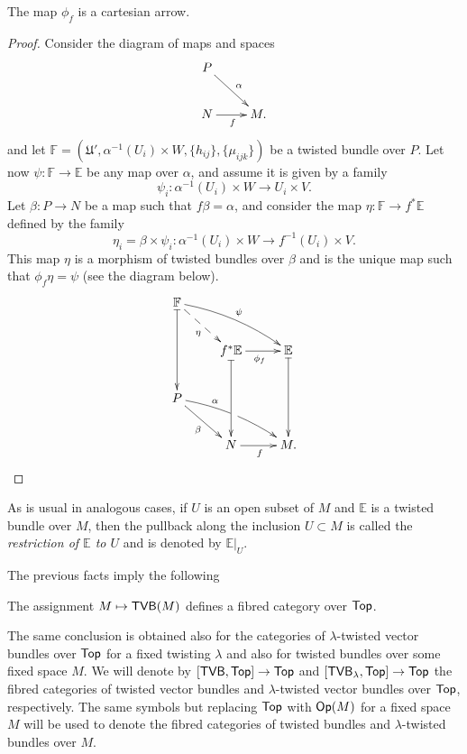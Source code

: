 \begin{proposition}\label{tvb_cartesian}
The map $\phi_f$ is a cartesian arrow.
\end{proposition}
\begin{proof}
Consider the diagram of maps and spaces
$$
\xymatrix{
P \ar[dr]^{\alpha} & \\
N\ar[r]_f & M.}
$$
and let $\mathbb{F} =(\mathfrak{U}',\alpha^{-1}(U_i)\times W,\{h_{ij}\},\{\mu_{ijk}\})$ be a twisted bundle over $P$. Let now $\psi :\mathbb{F}\to \mathbb{E}$ be any map over $\alpha$, and assume it is given by a family
$$\psi_i:\alpha^{-1}(U_i)\times W\longrightarrow U_i\times V.$$
Let $\beta :P\to N$ be a map such that $f\beta =\alpha$, and consider the map $\eta :\mathbb{F}\to f^*\mathbb{E}$ defined by the family
$$\eta_i=\beta \times \psi_i:\alpha^{-1}(U_i)\times W\longrightarrow f^{-1}(U_i)\times V.$$
This map $\eta$ is a morphism of twisted bundles over $\beta$ and is the unique map such that $\phi_f\eta =\psi$ (see the diagram below).
$$
\xymatrix{
   \mathbb{F}\ar@{|->}[dd] \ar@{-->}[rd]_{\eta} \ar@/^/[rrd]^{\psi} & & \\
   & f^*\mathbb{E}\ar@{|->}[dd]\ar[r]_{\phi_f} & \mathbb{E}\ar@{|->}[dd] \\
   P \ar[rd]_{\beta}\ar@/^/[rrd] ^(.3){\alpha} |(.487)\hole \\
   & N \ar[r]_f & M.}
$$
\end{proof}

As is usual in analogous cases, if $U$ is an open subset of $M$ and $\mathbb{E}$ is a twisted bundle over $M$, then the pullback along the inclusion $U\subset M$ is called the \emph{restriction of $\mathbb{E}$ to $U$} and is denoted by $\mathbb{E}|_U$.

The previous facts imply the following

\begin{proposition}
The assignment $M\mapsto \mathsf{TVB}(M)$ defines a fibred category over $\mathsf{Top}$.
\end{proposition}

The same conclusion is obtained also for the categories of $\lambda$-twisted vector bundles over $\mathsf{Top}$ for a fixed twisting $\lambda$ and also for twisted bundles over some fixed space $M$. We will denote by $[\mathsf{TVB},\mathsf{Top}]\to \mathsf{Top}$ and $[\mathsf{TVB}_{\lambda},\mathsf{Top}]\to \mathsf{Top}$ the fibred categories of twisted vector bundles and $\lambda$-twisted vector bundles over $\mathsf{Top}$, respectively. The same symbols but replacing $\mathsf{Top}$ with $\mathsf{Op}(M)$ for a fixed space $M$ will be used to denote the fibred categories of twisted bundles and $\lambda$-twisted bundles over $M$.

